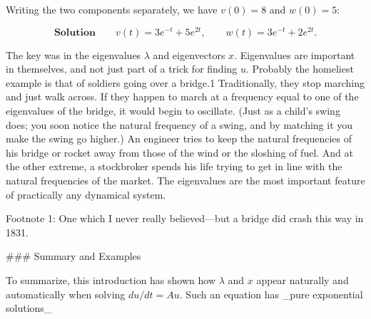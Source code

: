 Writing the two components separately, we have \(v(0)=8\) and \(w(0)=5\):

\[\textbf{Solution}\qquad v(t)=3e^{-t}+5e^{2t},\qquad w(t)=3e^{-t}+2e^{2t}.\]

The key was in the eigenvalues \(\lambda\) and eigenvectors \(x\). Eigenvalues are important in themselves, and not just part of a trick for finding \(u\). Probably the homeliest example is that of soldiers going over a bridge.1 Traditionally, they stop marching and just walk across. If they happen to march at a frequency equal to one of the eigenvalues of the bridge, it would begin to oscillate. (Just as a child's swing does; you soon notice the natural frequency of a swing, and by matching it you make the swing go higher.) An engineer tries to keep the natural frequencies of his bridge or rocket away from those of the wind or the sloshing of fuel. And at the other extreme, a stockbroker spends his life trying to get in line with the natural frequencies of the market. The eigenvalues are the most important feature of practically any dynamical system.

Footnote 1: One which I never really believed—but a bridge did crash this way in 1831.

### Summary and Examples

To summarize, this introduction has shown how \(\lambda\) and \(x\) appear naturally and automatically when solving \(du/dt=Au\). Such an equation has _pure exponential solutions_ 